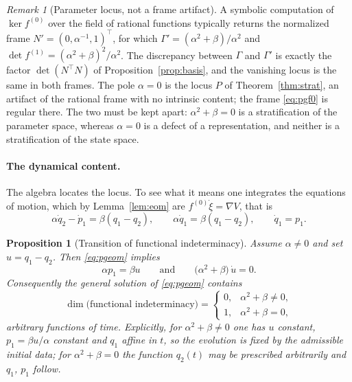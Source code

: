 \documentclass[12pt]{article}
\theoremstyle{plain}
\newtheorem{proposition}[theorem]{Proposition}
\theoremstyle{definition}
\theoremstyle{remark}
\newtheorem{remark}[theorem]{Remark}
\begin{document}
	\begin{remark}[Parameter locus, not a frame artifact]
		\label{rem:pgframe}
		A symbolic computation of $\ker f^{(0)}$ over the field of rational
		functions typically returns the normalized frame
		$N'=(0,\alpha^{-1},1)^{\top}$, for which
		$\Gamma'=(\alpha^{2}+\beta)/\alpha^{2}$ and
		$\det f^{(1)}=(\alpha^{2}+\beta)^{2}/\alpha^{2}$. The discrepancy between
		$\Gamma$ and $\Gamma'$ is exactly the factor $\det(N^{\top}N)$ of
		Proposition~\ref{prop:basis}, and the vanishing locus is the same in both
		frames. The pole $\alpha=0$ is the locus $P$ of Theorem~\ref{thm:strat}, an
		artifact of the rational frame with no intrinsic content; the frame
		\eqref{eq:pgf0} is regular there. The two must be kept apart:
		$\alpha^{2}+\beta=0$ is a stratification of the parameter space, whereas
		$\alpha=0$ is a defect of a representation, and neither is a stratification
		of the state space.
	\end{remark}
	
	\paragraph{The dynamical content.} The algebra locates the locus. To see what
	it means one integrates the equations of motion, which by Lemma~\ref{lem:eom}
	are $f^{(0)}\dot\xi=\nabla V$, that is
	\begin{equation}
		\alpha\dot q_{2}-\dot p_{1}=\beta(q_{1}-q_{2}),
		\qquad
		\alpha\dot q_{1}=\beta(q_{1}-q_{2}),
		\qquad
		\dot q_{1}=p_{1} .
		\label{eq:pgeom}
	\end{equation}
	
	\begin{proposition}[Transition of functional indeterminacy]
		\label{prop:pgtransition}
		Assume $\alpha\neq0$ and set $u=q_{1}-q_{2}$. Then \eqref{eq:pgeom} implies
		\begin{equation}
			\alpha p_{1}=\beta u
			\qquad\text{and}\qquad
			\bigl(\alpha^{2}+\beta\bigr)\,\dot u=0 .
			\label{eq:pgkey}
		\end{equation}
		Consequently the general solution of \eqref{eq:pgeom} contains
		\begin{equation}
			\dim\bigl(\text{functional indeterminacy}\bigr)
			=\begin{cases}
				0, & \alpha^{2}+\beta\neq0,\\[0.2em]
				1, & \alpha^{2}+\beta=0,
			\end{cases}
			\label{eq:pgindet}
		\end{equation}
		arbitrary functions of time. Explicitly, for $\alpha^{2}+\beta\neq0$ one has
		$u$ constant, $p_{1}=\beta u/\alpha$ constant and $q_{1}$ affine in $t$, so
		the evolution is fixed by the admissible initial data; for
		$\alpha^{2}+\beta=0$ the function $q_{2}(t)$ may be prescribed arbitrarily
		and $q_{1}$, $p_{1}$ follow.
	\end{proposition}
	
\end{document}

